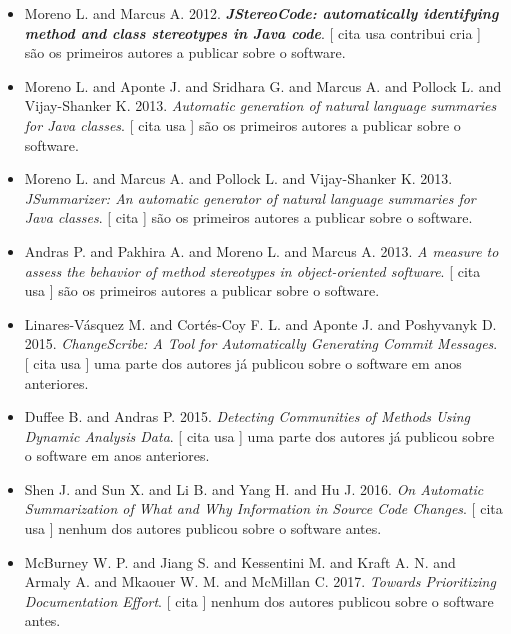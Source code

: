 \begin{itemize}
\item Moreno L. and Marcus A.
      2012.
        \textbf{\textit{ JStereoCode: automatically identifying method and class stereotypes in Java code}}.
      [
          cita
          usa
          contribui
          cria
      ]
são os primeiros autores a publicar sobre o software.
\item Moreno L. and Aponte J. and Sridhara G. and Marcus A. and Pollock L. and Vijay-Shanker K.
      2013.
        \textit{ Automatic generation of natural language summaries for Java classes}.
      [
          cita
          usa
      ]
são os primeiros autores a publicar sobre o software.
\item Moreno L. and Marcus A. and Pollock L. and Vijay-Shanker K.
      2013.
        \textit{ JSummarizer: An automatic generator of natural language summaries for Java classes}.
      [
          cita
      ]
são os primeiros autores a publicar sobre o software.
\item Andras P. and Pakhira A. and Moreno L. and Marcus A.
      2013.
        \textit{ A measure to assess the behavior of method stereotypes in object-oriented software}.
      [
          cita
          usa
      ]
são os primeiros autores a publicar sobre o software.
\item Linares-Vásquez M. and Cortés-Coy F. L. and Aponte J. and Poshyvanyk D.
      2015.
        \textit{ ChangeScribe: A Tool for Automatically Generating Commit Messages}.
      [
          cita
          usa
      ]
uma parte dos autores já publicou sobre o software em anos anteriores.
\item Duffee B. and Andras P.
      2015.
        \textit{ Detecting Communities of Methods Using Dynamic Analysis Data}.
      [
          cita
          usa
      ]
uma parte dos autores já publicou sobre o software em anos anteriores.
\item Shen J. and Sun X. and Li B. and Yang H. and Hu J.
      2016.
        \textit{ On Automatic Summarization of What and Why Information in Source Code Changes}.
      [
          cita
          usa
      ]
nenhum dos autores publicou sobre o software antes.
\item McBurney W. P. and Jiang S. and Kessentini M. and Kraft A. N. and Armaly A. and Mkaouer W. M. and McMillan C.
      2017.
        \textit{ Towards Prioritizing Documentation Effort}.
      [
          cita
      ]
nenhum dos autores publicou sobre o software antes.
\end{itemize}
